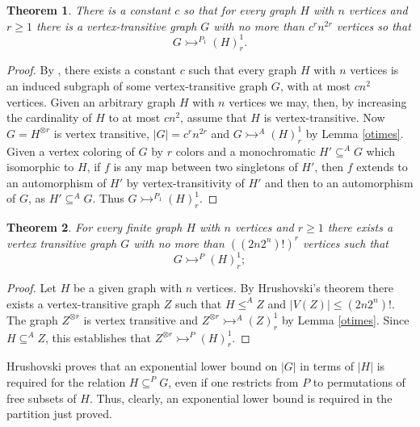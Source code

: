 \documentclass[11pt]{amsart}
\newcommand{\ars}{\rightarrowtail}
\newcommand{\su}{\subseteq}
\newtheorem{theorem}{Theorem}[section]
\begin{document}
\begin{theorem}\label{P1}
  There is a constant $c$ so that for every graph $H$ with $n$
  vertices and $r\ge 1$ there is a vertex-transitive graph $G$ with no
  more than $c^rn^{2r}$ vertices so that
\[G\ars^{P_1}(H)^1_r.\]
\end{theorem}

\begin{proof}
  By \cite{BS}, there exists a constant $c$ such that every graph $H$
  with $n$ vertices is an induced subgraph of some vertex-transitive
 graph $G$, with at most $cn^2$ vertices. Given an
  arbitrary graph $H$ with $n$ vertices we may, then,  by increasing the
  cardinality of $H$ to at most $cn^2$,  assume that $H$
  is vertex-transitive. Now $G=H^{\otimes r}$ is vertex transitive,
  $|G|=c^r n^{2r}$ and $G\ars^A(H)^1_r$ by Lemma \ref{otimes}. Given a
  vertex coloring of $G$ by $r$ colors and a monochromatic $H'\su ^A
  G$ which isomorphic to $H$, if  $f$ is any map between two
  singletons of $H'$, then $f$ extends to an automorphism of $H'$ by
  vertex-transitivity of $H'$ and then to an automorphism of $G$, as
  $H'\su ^A G$. Thus  $G\ars^{P_1}(H)^1_r$.
\end{proof}

\begin{theorem} \label{P} For every finite graph $H$ with $n$ vertices
  and $r\ge1$ there exists a vertex transitive graph $G$ with no more
  than $((2n2^n)!)^r$ vertices such that
\[G\ars^P(H)^1_r;\]
\end{theorem}

\begin{proof}
  Let $H$ be a given graph with $n$ vertices. By Hrushovski's theorem
  there exists a vertex-transitive graph $Z$ such that $H\le^A Z$ and
  $|V(Z)|\le (2n2^n)!$. The graph $Z^{\otimes r}$ is vertex transitive
  and $Z^{\otimes r}\ars^A(Z)^1_r$ by Lemma \ref{otimes}. Since
  $H\su^A Z$, this establishes that $Z^{\otimes r}\ars^P(H)^1_r$.
\end{proof}

Hrushovski \cite{H} proves that an exponential lower bound on $|G|$ in
terms of $|H|$ is required
 for the relation  $H\su^PG$, even if one restricts from  $P$ to
 permutations of free subsets of $H$. Thus, clearly, an exponential
 lower bound is required in the partition just proved. 
\end{document}
